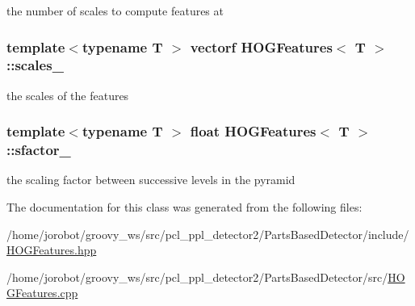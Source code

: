 the number of scales to compute features at 

\hypertarget{classHOGFeatures_a27490a8c33c7ffbfdeedafc5af0ad544}{
\subsubsection[{scales\-\_\-}]{\setlength{\rightskip}{0pt plus 5cm}template$<$typename T $>$ {\bf vectorf} {\bf \-H\-O\-G\-Features}$<$ \-T $>$\-::{\bf scales\-\_\-}}}\label{classHOGFeatures_a27490a8c33c7ffbfdeedafc5af0ad544}


the scales of the features 

\hypertarget{classHOGFeatures_a45b232ca94e93b4f30d342374e62578f}{
\subsubsection[{sfactor\-\_\-}]{\setlength{\rightskip}{0pt plus 5cm}template$<$typename T $>$ float {\bf \-H\-O\-G\-Features}$<$ \-T $>$\-::{\bf sfactor\-\_\-}}}\label{classHOGFeatures_a45b232ca94e93b4f30d342374e62578f}


the scaling factor between successive levels in the pyramid 



\-The documentation for this class was generated from the following files\-:\begin{DoxyCompactItemize}
\item 
/home/jorobot/groovy\-\_\-ws/src/pcl\-\_\-ppl\-\_\-detector2/\-Parts\-Based\-Detector/include/\hyperlink{HOGFeatures_8hpp}{\-H\-O\-G\-Features.\-hpp}\item 
/home/jorobot/groovy\-\_\-ws/src/pcl\-\_\-ppl\-\_\-detector2/\-Parts\-Based\-Detector/src/\hyperlink{HOGFeatures_8cpp}{\-H\-O\-G\-Features.\-cpp}\end{DoxyCompactItemize}
